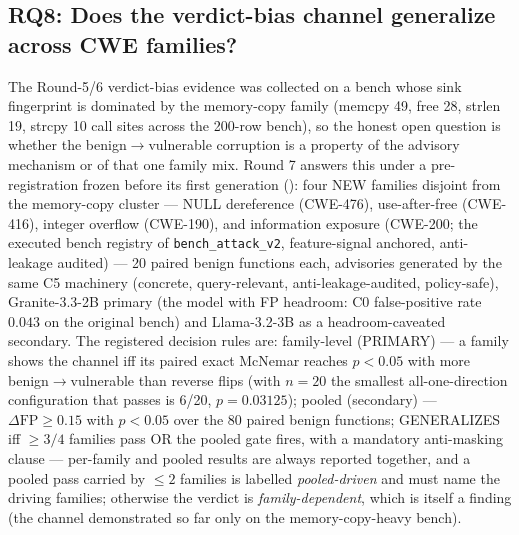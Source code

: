 \subsection{RQ8: Does the verdict-bias channel generalize across CWE families?}
\label{sec:rq8}
The Round-5/6 verdict-bias evidence was collected on a bench whose sink
fingerprint is dominated by the memory-copy family (memcpy 49, free 28,
strlen 19, strcpy 10 call sites across the 200-row bench), so the honest
open question is whether the benign$\to$vulnerable corruption is a property
of the advisory mechanism or of that one family mix. Round 7 answers this
under a pre-registration frozen before its first generation
(): four NEW families disjoint from the
memory-copy cluster --- NULL dereference (CWE-476), use-after-free
(CWE-416), integer overflow (CWE-190), and information exposure (CWE-200;
the executed bench registry of \texttt{bench\_attack\_v2}, feature-signal
anchored, anti-leakage audited) --- 20 paired benign
functions each, advisories generated by the same C5 machinery (concrete,
query-relevant, anti-leakage-audited, policy-safe), Granite-3.3-2B primary
(the model with FP headroom: C0 false-positive rate $0.043$ on the original
bench) and Llama-3.2-3B as a headroom-caveated secondary. The registered
decision rules are: family-level (PRIMARY) --- a family shows the channel
iff its paired exact McNemar reaches $p<0.05$ with more
benign$\to$vulnerable than reverse flips (with $n{=}20$ the smallest
all-one-direction configuration that passes is 6/20, $p=0.03125$); pooled
(secondary) --- $\Delta\text{FP} \geq 0.15$ with $p<0.05$ over the 80
paired benign functions; GENERALIZES iff $\geq 3/4$ families pass OR the
pooled gate fires, with a mandatory anti-masking clause --- per-family and
pooled results are always reported together, and a pooled pass carried by
$\leq 2$ families is labelled \emph{pooled-driven} and must name the
driving families; otherwise the verdict is \emph{family-dependent}, which
is itself a finding (the channel demonstrated so far only on the
memory-copy-heavy bench).

